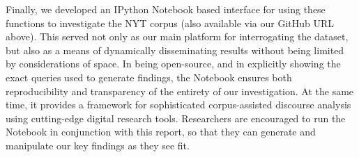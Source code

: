 Finally, we developed an IPython Notebook based interface for using these functions to investigate the NYT corpus (also available via our GitHub URL above). This served not only as our main platform for interrogating the dataset, but also as a means of dynamically disseminating results without being limited by considerations of space. In being open-source, and in explicitly showing the exact queries used to generate findings, the Notebook ensures both reproducibility and transparency of the entirety of our investigation. At the same time, it provides a framework for sophisticated corpus-assisted discourse analysis using cutting-edge digital research tools. Researchers are encouraged to run the Notebook in conjunction with this report, so that they can generate and manipulate our key findings as they see fit.

% 
% 
% 
